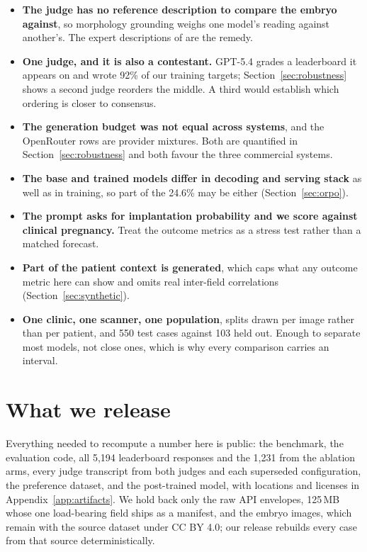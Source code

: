 \documentclass[11pt]{article}
\begin{document}
\begin{itemize}
\item \textbf{The judge has no reference description to compare the embryo
      against}, so morphology grounding weighs one model's reading against
      another's. The expert descriptions of \citet{neu2026dataset} are the
      remedy.
\item \textbf{One judge, and it is also a contestant.} GPT-5.4 grades a
      leaderboard it appears on and wrote 92\% of our training targets;
      Section~\ref{sec:robustness} shows a second judge reorders the middle. A
      third would establish which ordering is closer to consensus.
\item \textbf{The generation budget was not equal across systems}, and the
      OpenRouter rows are provider mixtures. Both are quantified in
      Section~\ref{sec:robustness} and both favour the three commercial systems.
\item \textbf{The base and trained models differ in decoding and serving stack}
      as well as in training, so part of the 24.6\% may be either
      (Section~\ref{sec:orpo}).
\item \textbf{The prompt asks for implantation probability and we score against
      clinical pregnancy.} Treat the outcome metrics as a stress test rather
      than a matched forecast.
\item \textbf{Part of the patient context is generated}, which caps what any
      outcome metric here can show and omits real inter-field correlations
      (Section~\ref{sec:synthetic}).
\item \textbf{One clinic, one scanner, one population}, splits drawn per image
      rather than per patient, and 550 test cases against 103 held out. Enough to
      separate most models, not close ones, which is why every comparison carries
      an interval.
\end{itemize}


\section{What we release}
\label{sec:release}


Everything needed to recompute a number here is public: the benchmark, the
evaluation code, all 5,194 leaderboard responses and the 1,231 from the ablation
arms, every judge transcript from both judges and each superseded configuration,
the preference dataset, and the post-trained model, with locations and licenses
in Appendix~\ref{app:artifacts}. We hold back only the raw API envelopes, 125\,MB
whose one load-bearing field ships as a manifest, and the embryo images, which
remain with the source dataset \citep{kromp2023} under CC BY 4.0; our release
rebuilds every case from that source deterministically.
\end{document}
